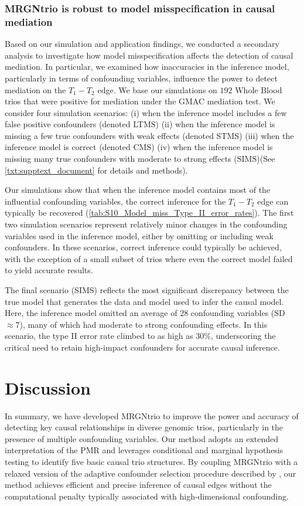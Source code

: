 \documentclass[12pt,letterpaper]{report}
\begin{document}
\begin{doublespace}
\subsubsection{MRGNtrio is robust to model misspecification in causal mediation}

Based on our simulation and application findings, we conducted a secondary analysis to investigate how model misspecification affects the detection of causal mediation. In particular, we examined how inaccuracies in the inference model, particularly in terms of confounding variables, influence the power to detect mediation on the $T_1 - T_2$ edge. We base our simulations on $192$ Whole Blood trios that were positive for mediation under the GMAC mediation test. We consider four simulation scenarios: (i) when the inference model includes a few false positive confounders (denoted LTMS) (ii) when the inference model is missing a few true confounders with weak effects (denoted STMS) (iii) when the inference model is correct (denoted CMS) (iv) when the inference model is missing many true confounders with moderate to strong effects (SIMS)(See \autoref{txt:supptext_document} for details and methods).

Our simulations show that when the inference model contains most of the influential confounding variables, the correct inference for the $T_1 - T_2$ edge can typically be recovered (\autoref{tab:S10_Model_miss_Type_II_error_rates}). The first two simulation scenarios represent relatively minor changes in the confounding variables used in the inference model, either by omitting or including weak confounders. In these scenarios, correct inference could typically be achieved, with the exception of a small subset of trios where even the correct model failed to yield accurate results.

The final scenario (SIMS) reflects the most significant discrepancy between the true model that generates the data and model used to infer the causal model. Here, the inference model omitted an average of $28$ confounding variables (SD $\approx 7$), many of which had moderate to strong confounding effects. In this scenario, the type II error rate climbed to as high as $30\%$, underscoring the critical need to retain high-impact confounders for accurate causal inference.

\section{Discussion}
In summary, we have developed MRGNtrio to improve the power and accuracy of detecting key causal relationships in diverse genomic trios, particularly in the presence of multiple confounding variables. Our method adopts an extended interpretation of the PMR \cite{badsha2019learning} and leverages conditional and marginal hypothesis testing to identify five basic causal trio structures. By coupling MRGNtrio with a relaxed version of the adaptive confounder selection procedure described by \cite{yang2017identifying}, our method achieves efficient and precise inference of causal edges without the computational penalty typically associated with high-dimensional confounding.


\end{doublespace}
\end{document}
